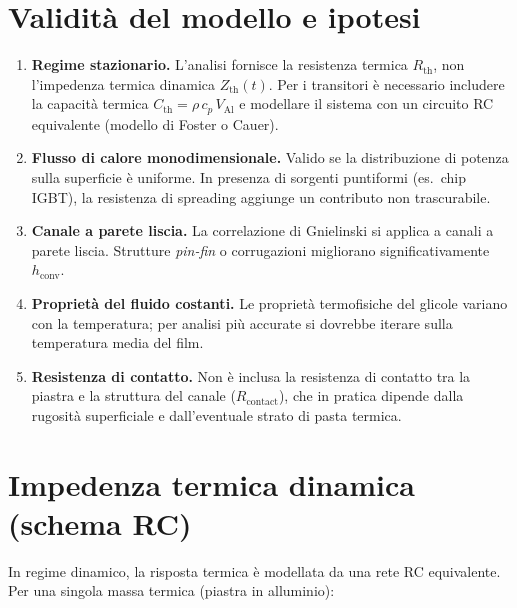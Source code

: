 \documentclass[a4paper,11pt]{article}
\begin{document}
\section{Validità del modello e ipotesi}

\begin{enumerate}
  \item \textbf{Regime stazionario.} L'analisi fornisce la resistenza termica $R_{\mathrm{th}}$,
        non l'impedenza termica dinamica $Z_{\mathrm{th}}(t)$. Per i transitori è necessario
        includere la capacità termica $C_{\mathrm{th}} = \rho\,c_p\,V_{\mathrm{Al}}$
        e modellare il sistema con un circuito RC equivalente (modello di Foster o Cauer).

  \item \textbf{Flusso di calore monodimensionale.} Valido se la distribuzione di potenza
        sulla superficie è uniforme. In presenza di sorgenti puntiformi (es.\ chip IGBT),
        la resistenza di spreading aggiunge un contributo non trascurabile.

  \item \textbf{Canale a parete liscia.} La correlazione di Gnielinski si applica a canali
        a parete liscia. Strutture \textit{pin-fin} o corrugazioni migliorano
        significativamente $h_{\mathrm{conv}}$.

  \item \textbf{Proprietà del fluido costanti.} Le proprietà termofisiche del glicole
        variano con la temperatura; per analisi più accurate si dovrebbe iterare sulla
        temperatura media del film.

  \item \textbf{Resistenza di contatto.} Non è inclusa la resistenza di contatto
        tra la piastra e la struttura del canale ($R_{\mathrm{contact}}$), che in
        pratica dipende dalla rugosità superficiale e dall'eventuale strato di
        pasta termica.
\end{enumerate}

\section{Impedenza termica dinamica (schema RC)}

In regime dinamico, la risposta termica è modellata da una rete RC equivalente.
Per una singola massa termica (piastra in alluminio):
\end{document}
